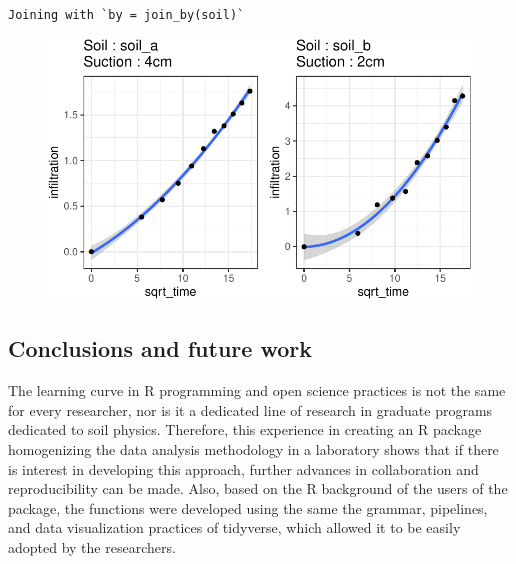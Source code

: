 \documentclass[
]{article}
\newenvironment{Shaded}{\begin{snugshade}}{\end{snugshade}}
\newcommand{\AttributeTok}[1]{\textcolor[rgb]{0.40,0.45,0.13}{#1}}
\newcommand{\DecValTok}[1]{\textcolor[rgb]{0.68,0.00,0.00}{#1}}
\newcommand{\FunctionTok}[1]{\textcolor[rgb]{0.28,0.35,0.67}{#1}}
\newcommand{\NormalTok}[1]{\textcolor[rgb]{0.00,0.23,0.31}{#1}}
\newcommand{\SpecialCharTok}[1]{\textcolor[rgb]{0.37,0.37,0.37}{#1}}
\begin{document}
\begin{verbatim}
Joining with `by = join_by(soil)`
\end{verbatim}

\begin{Shaded}
\end{Shaded}

\begin{figure}[H]

{\centering \includegraphics{infiltrodiscR_paper_files/figure-pdf/unnamed-chunk-9-1.pdf}

}

\end{figure}

\hypertarget{conclusions-and-future-work}{%
\subsection{Conclusions and future
work}\label{conclusions-and-future-work}}

The learning curve in R programming and open science practices is not
the same for every researcher, nor is it a dedicated line of research in
graduate programs dedicated to soil physics. Therefore, this experience
in creating an R package homogenizing the data analysis methodology in a
laboratory shows that if there is interest in developing this approach,
further advances in collaboration and reproducibility can be made. Also,
based on the R background of the users of the package, the functions
were developed using the same the grammar, pipelines, and data
visualization practices of tidyverse, which allowed it to be easily
adopted by the researchers.
\end{document}
